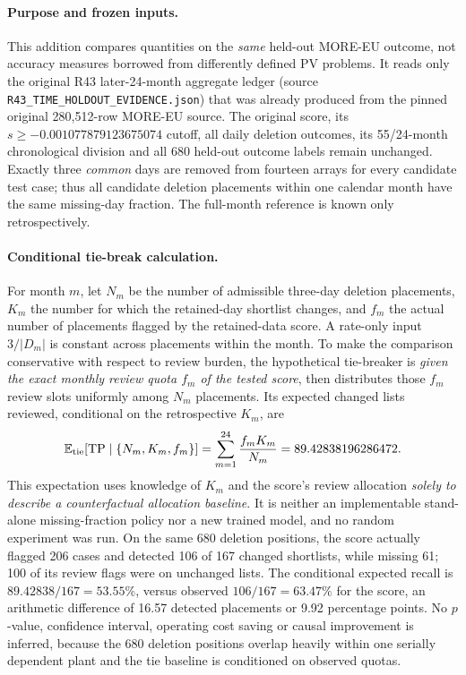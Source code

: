 \documentclass[11pt]{article}
\begin{document}
\paragraph{Purpose and frozen inputs.} This addition compares quantities on the \emph{same} held-out MORE-EU outcome, not accuracy measures borrowed from differently defined PV problems. It reads only the original R43 later-24-month aggregate ledger (source \texttt{R43\_TIME\_HOLDOUT\_EVIDENCE.json}) that was already produced from the pinned original 280,512-row MORE-EU source. The original score, its $s\geq-0.001077879123675074$ cutoff, all daily deletion outcomes, its 55/24-month chronological division and all 680 held-out outcome labels remain unchanged. Exactly three \emph{common} days are removed from fourteen arrays for every candidate test case; thus all candidate deletion placements within one calendar month have the same missing-day fraction. The full-month reference is known only retrospectively.

\paragraph{Conditional tie-break calculation.} For month $m$, let $N_m$ be the number of admissible three-day deletion placements, $K_m$ the number for which the retained-day shortlist changes, and $f_m$ the actual number of placements flagged by the retained-data score. A rate-only input $3/|D_m|$ is constant across placements within the month. To make the comparison conservative with respect to review burden, the hypothetical tie-breaker is \emph{given the exact monthly review quota $f_m$ of the tested score}, then distributes those $f_m$ review slots uniformly among $N_m$ placements. Its expected changed lists reviewed, conditional on the retrospective $K_m$, are
\[
\mathbb{E}_{\rm tie}[\mathrm{TP}\mid \{N_m,K_m,f_m\}]
    = \sum_{m=1}^{24}\frac{f_mK_m}{N_m}
    = 89.42838196286472.
\]
This expectation uses knowledge of $K_m$ and the score's review allocation \emph{solely to describe a counterfactual allocation baseline}. It is neither an implementable stand-alone missing-fraction policy nor a new trained model, and no random experiment was run. On the same 680 deletion positions, the score actually flagged 206 cases and detected 106 of 167 changed shortlists, while missing 61; 100 of its review flags were on unchanged lists. The conditional expected recall is $89.42838/167=53.55\%$, versus observed $106/167=63.47\%$ for the score, an arithmetic difference of 16.57 detected placements or 9.92 percentage points. No $p$-value, confidence interval, operating cost saving or causal improvement is inferred, because the 680 deletion positions overlap heavily within one serially dependent plant and the tie baseline is conditioned on observed quotas.
\end{document}
